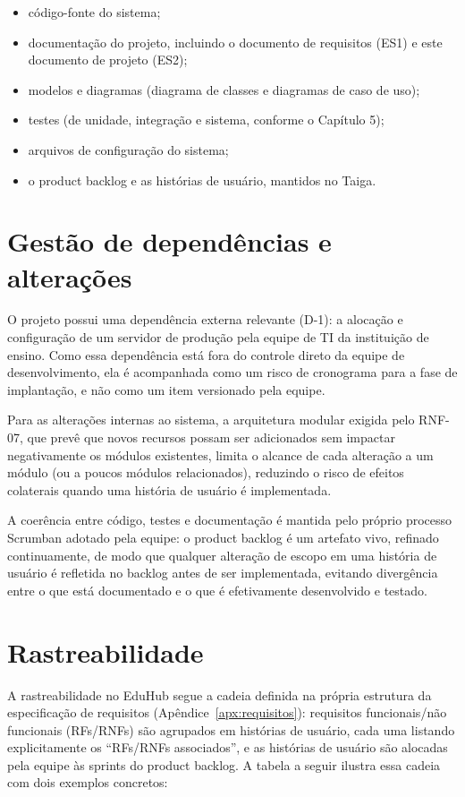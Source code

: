 \begin{itemize}
    \item código-fonte do sistema;
    \item documentação do projeto, incluindo o documento de requisitos (ES1)
    e este documento de projeto (ES2);
    \item modelos e diagramas (diagrama de classes e diagramas de caso de
    uso);
    \item testes (de unidade, integração e sistema, conforme o Capítulo 5);
    \item arquivos de configuração do sistema;
    \item o product backlog e as histórias de usuário, mantidos no Taiga.
\end{itemize}

\section{Gestão de dependências e alterações}

O projeto possui uma dependência externa relevante (D-1): a alocação e
configuração de um servidor de produção pela equipe de TI da instituição de
ensino. Como essa dependência está fora do controle direto da equipe de
desenvolvimento, ela é acompanhada como um risco de cronograma para a fase
de implantação, e não como um item versionado pela equipe.

Para as alterações internas ao sistema, a arquitetura modular exigida pelo
RNF-07, que prevê que novos recursos possam ser adicionados sem impactar
negativamente os módulos existentes, limita o alcance de cada alteração a
um módulo (ou a poucos módulos relacionados), reduzindo o risco de efeitos
colaterais quando uma história de usuário é implementada.

A coerência entre código, testes e documentação é mantida pelo próprio
processo Scrumban adotado pela equipe: o product backlog é um artefato
vivo, refinado continuamente, de modo que qualquer
alteração de escopo em uma história de usuário é refletida no backlog antes
de ser implementada, evitando divergência entre o que está documentado e o
que é efetivamente desenvolvido e testado.

\section{Rastreabilidade}

A rastreabilidade no EduHub segue a cadeia definida na própria estrutura da
especificação de requisitos (Apêndice~\ref{apx:requisitos}): requisitos
funcionais/não funcionais (RFs/RNFs) são agrupados em histórias de usuário,
cada uma listando explicitamente os ``RFs/RNFs associados'', e as histórias
de usuário são alocadas pela equipe às sprints do product backlog. A tabela a seguir
ilustra essa cadeia com dois exemplos concretos:

